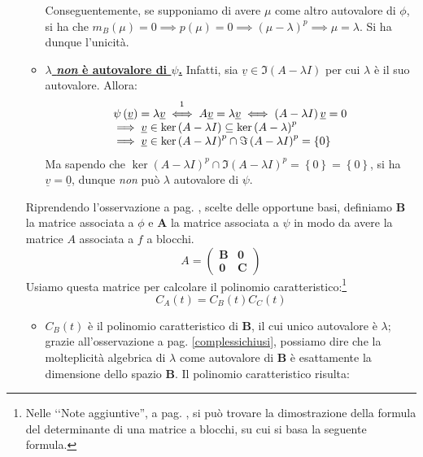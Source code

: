 \begin{demonstration}
\begin{enumerate}[label=\Roman*]
\begin{itemize}
Conseguentemente, se supponiamo di avere $\mu$ come altro autovalore di $\phi$, si ha che $m_B\left(\mu\right)=0\implies p\left(\mu\right)=0\implies \left(\mu-\lambda\right)^p\implies \mu=\lambda$. Si ha dunque l'unicità.
\item \textbf{\underline{$\lambda$ \textit{non} è autovalore di $\psi$.}} Infatti, sia $\underline{v}\in \Im\left(A-\lambda I\right)$ per cui $\lambda$ è il suo autovalore. Allora:
\begin{equation*}
		\begin{array}{l}
	\psi\left(\underline{v}\right)=\lambda\underline{v}\stackrel{\footnote{$A\underline{v}$ segue dalla definizione di $\psi$ come restrizione dell'endomorfismo $f$.}}{\iff} A\underline{v}=\lambda\underline{v}\iff \left(A-\lambda I\right)\underline{v}=0\\
	\implies \underline{v}\in\ker\left(A-\lambda I\right)\subseteq \ker\left(A-\lambda\right)^p\\
	\implies \underline{v}\in\ker\left(A-\lambda I\right)^p\cap\Im\left(A-\lambda I\right)^p=\left\{0\right\}
	\end{array}
\end{equation*}
Ma sapendo che $\ker\left(A-\lambda I\right)^p\cap\Im\left(A-\lambda I\right)^p=\left\{0\right\}=\left\{0\right\}$, si ha $\underline{v}=\underline{0}$, dunque \textit{non} può $\lambda$ autovalore di $\psi$.
\end{itemize}
Riprendendo l'osservazione a pag. \pageref{observejordan}, scelte delle opportune basi, definiamo $\mathbf{B}$ la matrice associata a $\phi$ e $\mathbf{A}$ la matrice associata a $\psi$ in modo da avere la matrice $A$ associata a $f$ a blocchi.
\begin{equation*}
	A = \left(
	\begin{array}{c|c}
		\mathbf{B} & \mathbf{0}\\
		\hline
		\mathbf{0} & \mathbf{C}
	\end{array}
	\right)
\end{equation*}
Usiamo questa matrice per calcolare il polinomio caratteristico:\footnote{Nelle ‘‘Note aggiuntive'', a pag. \pageref{dimostrazionedeterminantematriceblocchi}, si può trovare la dimostrazione della formula del determinante di una matrice a blocchi, su cui si basa la seguente formula.}
\begin{equation*}
C_A\left(t\right)=C_B\left(t\right)C_C\left(t\right)
\end{equation*}
\begin{itemize}
	\item $C_B\left(t\right)$ è il polinomio caratteristico di $\mathbf{B}$, il cui unico autovalore è $\lambda$; grazie all'osservazione a pag. \ref{complessichiusi}, possiamo dire che la molteplicità algebrica di $\lambda$ come autovalore di $\mathbf{B}$ è esattamente la dimensione dello spazio $\mathbf{B}$. Il polinomio caratteristico risulta:

\end{itemize}
\end{enumerate}
\end{demonstration}
